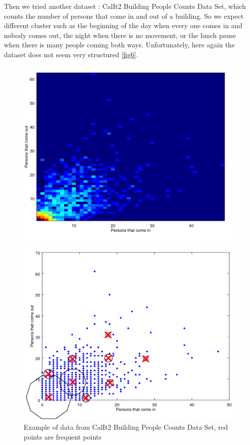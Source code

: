 \documentclass{article}
\begin{document}
Then we tried another dataset : CalIt2 Building People Counts Data Set, which counts the number of persons that come in and out of a building. So we expect different cluster such as the beginning of the day when every one comes in and nobody comes out, the night when there is no movement, or the lunch pause when there is many people coming both ways. Unfortunately, here again the dataset does not seem very structured \ref{fig6}.

\begin{figure}[h]
	\begin{minipage}[b]{.49\linewidth}
		\vspace{10pt}
		\includegraphics[width=1.0\textwidth]{building.png}
		\begin{center}
			\caption{Example of data from CalIt2 Building People Counts Data Set, red points are frequent points}
		\end{center}\medskip
	\end{minipage}
	\hfill
	\begin{minipage}[b]{0.49\linewidth}
		\includegraphics[width=1.0\textwidth]{expe4.png}

\end{minipage}
\end{figure}
\end{document}
